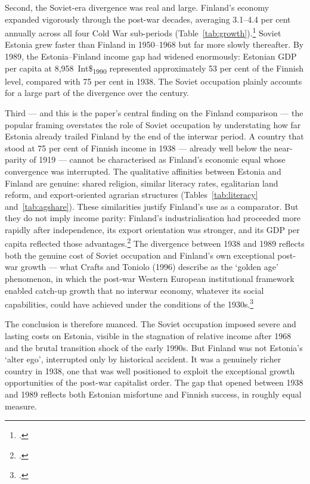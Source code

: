 \documentclass[12pt,a4paper]{article}
\newcommand{\intlnineteen}{Int\$\textsubscript{1990}}   %
\begin{document}
Second, the Soviet-era divergence was real and large. Finland's economy expanded vigorously through the post-war decades, averaging 3.1--4.4 per cent annually across all four Cold War sub-periods (Table~\ref{tab:growth}).\footnote{\autocite{mpd2023}.} Soviet Estonia grew faster than Finland in 1950--1968 but far more slowly thereafter. By 1989, the Estonia--Finland income gap had widened enormously: Estonian GDP per capita at 8,958~\intlnineteen{} represented approximately 53 per cent of the Finnish level, compared with 75 per cent in 1938. The Soviet occupation plainly accounts for a large part of the divergence over the century.

Third — and this is the paper's central finding on the Finland comparison — the popular framing overstates the role of Soviet occupation by understating how far Estonia already trailed Finland by the end of the interwar period. A country that stood at 75 per cent of Finnish income in 1938 — already well below the near-parity of 1919 — cannot be characterised as Finland's economic equal whose convergence was interrupted. The qualitative affinities between Estonia and Finland are genuine: shared religion, similar literacy rates, egalitarian land reform, and export-oriented agrarian structures (Tables~\ref{tab:literacy} and~\ref{tab:agshare}). These similarities justify Finland's use as a comparator. But they do not imply income parity: Finland's industrialisation had proceeded more rapidly after independence, its export orientation was stronger, and its GDP per capita reflected those advantages.\footnote{\autocite[184, 198--200]{finlandeh01}.} The divergence between 1938 and 1989 reflects both the genuine cost of Soviet occupation and Finland's own exceptional post-war growth — what Crafts and Toniolo (1996) describe as the `golden age' phenomenon, in which the post-war Western European institutional framework enabled catch-up growth that no interwar economy, whatever its social capabilities, could have achieved under the conditions of the 1930s.\footnote{\autocite[1--37]{crafts_toniolo1996}.}

The conclusion is therefore nuanced. The Soviet occupation imposed severe and lasting costs on Estonia, visible in the stagnation of relative income after 1968 and the brutal transition shock of the early 1990s. But Finland was not Estonia's `alter ego', interrupted only by historical accident. It was a genuinely richer country in 1938, one that was well positioned to exploit the exceptional growth opportunities of the post-war capitalist order. The gap that opened between 1938 and 1989 reflects both Estonian misfortune and Finnish success, in roughly equal measure.
\end{document}
